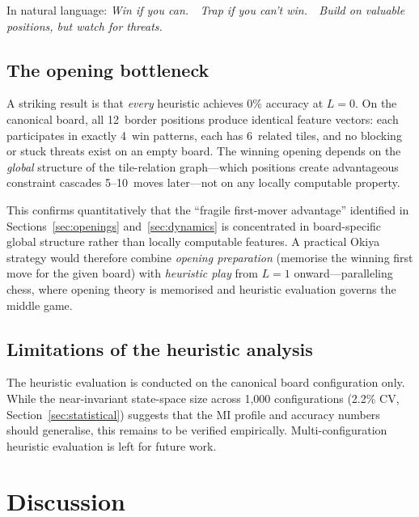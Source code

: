 \documentclass[11pt,a4paper]{article}
\begin{document}
\noindent In natural language: \emph{Win if you can.\ \ Trap if you
can't win.\ \ Build on valuable positions, but watch for threats.}

\subsection{The opening bottleneck}\label{sec:opening-bottleneck}

A striking result is that \emph{every} heuristic achieves 0\% accuracy
at $L{=}0$.  On the canonical board, all 12~border positions produce
identical feature vectors: each participates in exactly 4~win patterns,
each has 6~related tiles, and no blocking or stuck threats exist on an
empty board.  The winning opening depends on the \emph{global} structure
of the tile-relation graph---which positions create advantageous
constraint cascades 5--10~moves later---not on any locally computable
property.

This confirms quantitatively that the ``fragile first-mover advantage''
identified in Sections~\ref{sec:openings} and~\ref{sec:dynamics} is
concentrated in board-specific global structure rather than locally
computable features.  A practical Okiya strategy would therefore combine
\emph{opening preparation} (memorise the winning first move for the
given board) with \emph{heuristic play} from $L{=}1$ onward---paralleling
chess, where opening theory is memorised and heuristic evaluation governs
the middle game.

\subsection{Limitations of the heuristic analysis}

The heuristic evaluation is conducted on the canonical board
configuration only.  While the near-invariant state-space size across
1{,}000 configurations (2.2\% CV, Section~\ref{sec:statistical})
suggests that the MI profile and accuracy numbers should generalise,
this remains to be verified empirically.  Multi-configuration heuristic
evaluation is left for future work.

\section{Discussion}
\end{document}
